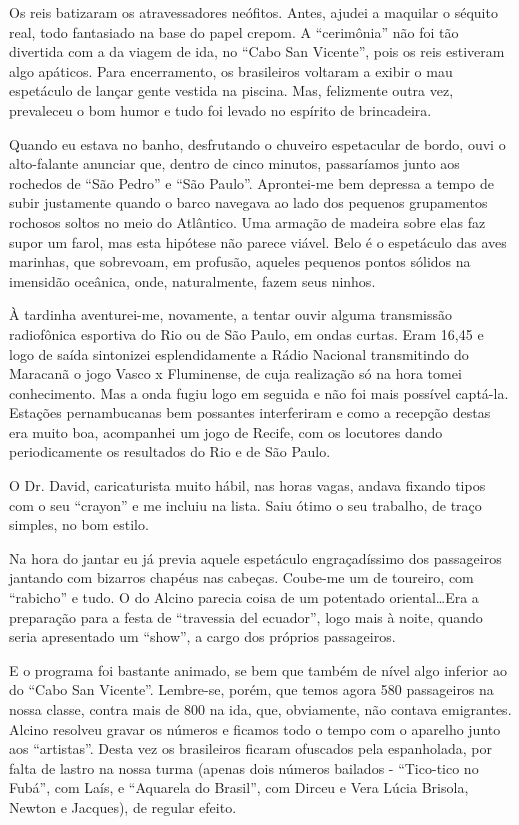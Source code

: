 Os reis batizaram os atravessadores neófitos. Antes, ajudei a maquilar o séquito real, todo fantasiado na base do papel crepom. A ``cerimônia'' não foi tão divertida com a da viagem de ida, no ``Cabo San Vicente'', pois os reis estiveram algo apáticos. Para encerramento, os brasileiros voltaram a exibir o mau espetáculo de lançar gente vestida na piscina. Mas, felizmente outra vez, prevaleceu o bom humor e tudo foi levado no espírito de brincadeira.

Quando eu estava no banho, desfrutando o chuveiro espetacular de bordo, ouvi o alto-falante anunciar que, dentro de cinco minutos, passaríamos junto aos rochedos de ``São Pedro'' e ``São Paulo''. Aprontei-me bem depressa a tempo de subir justamente quando o barco navegava ao lado dos pequenos grupamentos rochosos soltos no meio do Atlântico. Uma armação de madeira sobre elas faz supor um farol, mas esta hipótese não parece viável. Belo é o espetáculo das aves marinhas, que sobrevoam, em profusão, aqueles pequenos pontos sólidos na imensidão oceânica, onde, naturalmente, fazem seus ninhos.

À tardinha aventurei-me, novamente, a tentar ouvir alguma transmissão radiofônica esportiva do Rio ou de São Paulo, em ondas curtas. Eram 16,45 e logo de saída sintonizei esplendidamente a Rádio Nacional transmitindo do Maracanã o jogo Vasco x Fluminense, de cuja realização só na hora tomei conhecimento. Mas a onda fugiu logo em seguida e não foi mais possível captá-la. Estações pernambucanas bem possantes interferiram e como a recepção destas era muito boa, acompanhei um jogo de Recife, com os locutores dando periodicamente os resultados do Rio e de São Paulo.

O Dr. David, caricaturista muito hábil, nas horas vagas, andava fixando tipos com o seu ``crayon'' e me incluiu na lista. Saiu ótimo o seu trabalho, de traço simples, no bom estilo.

Na hora do jantar eu já previa aquele espetáculo engraçadíssimo dos passageiros jantando com bizarros chapéus nas cabeças. Coube-me um de toureiro, com ``rabicho'' e tudo. O do Alcino parecia coisa de um potentado oriental\ldots Era a preparação para a festa de ``travessia del ecuador'', logo mais à noite, quando seria apresentado um ``show'', a cargo dos próprios passageiros.

E o programa foi bastante animado, se bem que também de nível algo inferior ao do ``Cabo San Vicente''. Lembre-se, porém, que temos agora 580 passageiros na nossa classe, contra mais de 800 na ida, que, obviamente, não contava emigrantes. Alcino resolveu gravar os números e ficamos todo o tempo com o aparelho junto aos ``artistas''. Desta vez os brasileiros ficaram ofuscados pela espanholada, por falta de lastro na nossa turma (apenas dois números bailados - ``Tico-tico no Fubá'', com Laís, e ``Aquarela do Brasil'', com Dirceu e Vera Lúcia Brisola, Newton e Jacques), de regular efeito.

